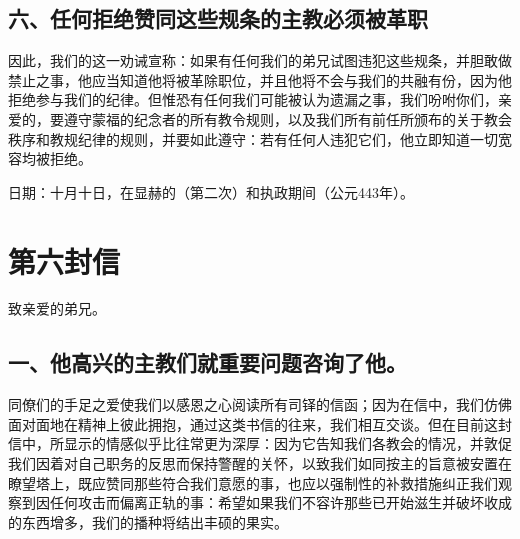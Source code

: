 
\subsection{六、任何拒绝赞同这些规条的主教必须被革职}

因此，我们的这一劝诫宣称：如果有任何我们的弟兄试图违犯这些规条，并胆敢做禁止之事，他应当知道他将被革除职位，并且他将不会与我们的共融有份，因为他拒绝参与我们的纪律。但惟恐有任何我们可能被认为遗漏之事，我们吩咐你们，亲爱的，要遵守蒙福的纪念者的所有教令规则，以及我们所有前任所颁布的关于教会秩序和教规纪律的规则，并要如此遵守：若有任何人违犯它们，他立即知道一切宽容均被拒绝。\par

日期：十月十日，在显赫的（第二次）和执政期间（公元443年）。\par



\section{第六封信}

致亲爱的弟兄。\par


\subsection{一、他高兴的主教们就重要问题咨询了他。}

同僚们的手足之爱使我们以感恩之心阅读所有司铎的信函；因为在信中，我们仿佛面对面地在精神上彼此拥抱，通过这类书信的往来，我们相互交谈。但在目前这封信中，所显示的情感似乎比往常更为深厚：因为它告知我们各教会的情况，并敦促我们因着对自己职务的反思而保持警醒的关怀，以致我们如同按主的旨意被安置在瞭望塔上，既应赞同那些符合我们意愿的事，也应以强制性的补救措施纠正我们观察到因任何攻击而偏离正轨的事：希望如果我们不容许那些已开始滋生并破坏收成的东西增多，我们的播种将结出丰硕的果实。\par

